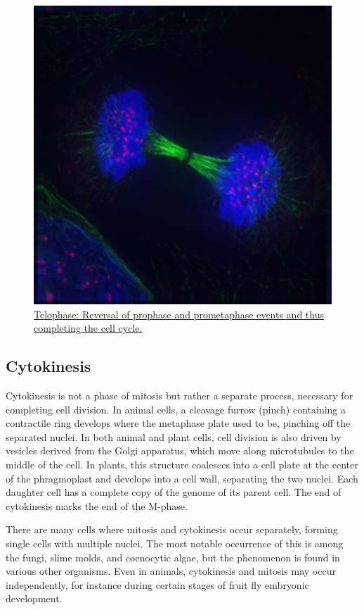 \begin{figure}

{\centering \includegraphics[width=0.7\linewidth]{./figures/reproduction/TelophaseIF} 

}

\caption{\href{https://commons.wikimedia.org/wiki/File:TelophaseIF.jpg}{Telophase: Reversal of prophase and prometaphase events and thus completing the cell cycle.}}\label{fig:telophase}
\end{figure}

\hypertarget{cytokinesis}{%
\subsection{Cytokinesis}\label{cytokinesis}}

Cytokinesis is not a phase of mitosis but rather a separate process, necessary for completing cell division. In animal cells, a cleavage furrow (pinch) containing a contractile ring develops where the metaphase plate used to be, pinching off the separated nuclei. In both animal and plant cells, cell division is also driven by vesicles derived from the Golgi apparatus, which move along microtubules to the middle of the cell. In plants, this structure coalesces into a cell plate at the center of the phragmoplast and develops into a cell wall, separating the two nuclei. Each daughter cell has a complete copy of the genome of its parent cell. The end of cytokinesis marks the end of the M-phase.

There are many cells where mitosis and cytokinesis occur separately, forming single cells with multiple nuclei. The most notable occurrence of this is among the fungi, slime molds, and coenocytic algae, but the phenomenon is found in various other organisms. Even in animals, cytokinesis and mitosis may occur independently, for instance during certain stages of fruit fly embryonic development.

